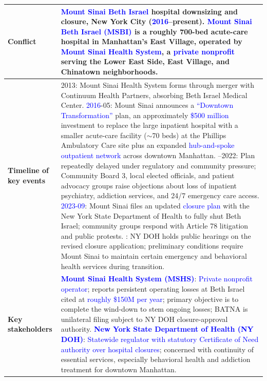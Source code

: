 \begin{table}[p]
\centering
\tiny
\renewcommand{\arraystretch}{1.15}
\begin{tabularx}{\textwidth}{@{}l X@{}}
\toprule
\textbf{Conflict} & \textcolor{blue}{Mount Sinai Beth Israel} hospital downsizing and closure, New York City (\textcolor{blue}{2016}--present). \textcolor{blue}{Mount Sinai Beth Israel (MSBI)} is a roughly 700-bed acute-care hospital in Manhattan's East Village, operated by \textcolor{blue}{Mount Sinai Health System}, a \textcolor{blue}{private nonprofit} serving the Lower East Side, East Village, and Chinatown neighborhoods. \\
\midrule
\textbf{Timeline of key events} &
2013: Mount Sinai Health System forms through merger with Continuum Health Partners, absorbing Beth Israel Medical Center.
\newline
\textcolor{blue}{2016}-05: Mount Sinai announces a \textcolor{blue}{``Downtown Transformation''} plan, an approximately \textcolor{blue}{\$500 million} investment to replace the large inpatient hospital with a smaller acute-care facility ($\sim$70 beds) at the Phillips Ambulatory Care site plus an expanded \textcolor{blue}{hub-and-spoke outpatient network} across downtown Manhattan.
\newline
2016--2022: Plan repeatedly delayed under regulatory and community pressure; Community Board 3, local elected officials, and patient advocacy groups raise objections about loss of inpatient psychiatry, addiction services, and 24/7 emergency care access.
\newline
\textcolor{blue}{2023-09}: Mount Sinai files an updated \textcolor{blue}{closure plan} with the New York State Department of Health to fully shut Beth Israel; community groups respond with Article 78 litigation and public protests.
\newline
2024: NY DOH holds public hearings on the revised closure application; preliminary conditions require Mount Sinai to maintain certain emergency and behavioral health services during transition. \\
\midrule
\textbf{Key stakeholders} &
\textcolor{blue}{\textbf{Mount Sinai Health System (MSHS)}}: \textcolor{blue}{Private nonprofit operator}; reports persistent operating losses at Beth Israel cited at \textcolor{blue}{roughly \$150M per year}; primary objective is to complete the wind-down to stem ongoing losses; BATNA is unilateral filing subject to NY DOH closure-approval authority.
\newline
\textcolor{blue}{\textbf{New York State Department of Health (NY DOH)}}: \textcolor{blue}{Statewide regulator with statutory Certificate of Need authority over hospital closures}; concerned with continuity of essential services, especially behavioral health and addiction treatment for downtown Manhattan.

\end{tabularx}
\end{table}
